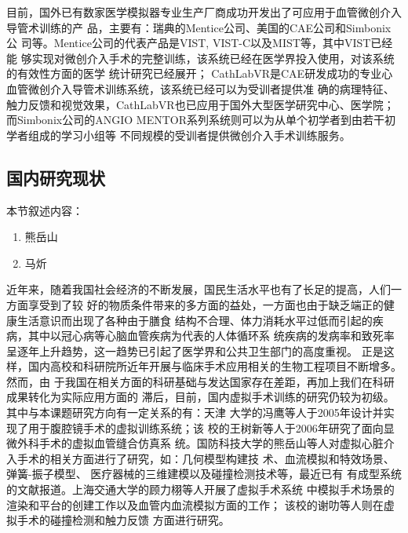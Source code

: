 目前，国外已有数家医学模拟器专业生产厂商成功开发出了可应用于血管微创介入导管术训练的产
品，主要有：瑞典的Mentice公司\cite{menticeweb}、美国的CAE公司\cite{caeweb}和Simbonix公
司\cite{simbionixweb}等。Mentice公司的代表产品是VIST, VIST-C以及MIST等，其中VIST已经能
够实现对微创介入手术的完整训练，该系统已经在医学界投入使用，对该系统的有效性方面的医学
统计研究已经展开\cite{duncan2006analysis}\cite{tedesco2008simulation}\cite{glaiberman2008simulation}；
CathLabVR是CAE研发成功的专业心血管微创介入导管术训练系统，该系统已经可以为受训者提供准
确的病理特征、触力反馈和视觉效果，CathLabVR也已应用于国外大型医学研究中心、医学院\cite{voelker2011improved}；
而Simbonix公司的ANGIO MENTOR系列系统则可以为从单个初学者到由若干初学者组成的学习小组等
不同规模的受训者提供微创介入手术训练服务\cite{hislop2009simulation}。

\subsection{国内研究现状}

本节叙述内容：
\begin{enumerate}
  \item 熊岳山
  \item 马炘
\end{enumerate}

近年来，随着我国社会经济的不断发展，国民生活水平也有了长足的提高，人们一方面享受到了较
好的物质条件带来的多方面的益处，一方面也由于缺乏端正的健康生活意识而出现了各种由于膳食
结构不合理、体力消耗水平过低而引起的疾病，其中以冠心病等心脑血管疾病为代表的人体循环系
统疾病的发病率和致死率呈逐年上升趋势，这一趋势已引起了医学界和公共卫生部门的高度重视。
正是这样，国内高校和科研院所近年开展与临床手术应用相关的生物工程项目不断增多。然而，由
于我国在相关方面的科研基础与发达国家存在差距，再加上我们在科研成果转化为实际应用方面的
滞后，目前，国内虚拟手术训练的研究仍较为初级。其中与本课题研究方向有一定关系的有：天津
大学的冯鹰\cite{li2005master}等人于2005年设计并实现了用于腹腔镜手术的虚拟训练系统；该
校的王树新等人\cite{zeng2006master}于2006年研究了面向显微外科手术的虚拟血管缝合仿真系
统。国防科技大学的熊岳山等人对虚拟心脏介入手术的相关方面进行了研究，如：几何模型构建技
术\cite{han2005master}、血流模拟和特效场景\cite{ren2005master}、弹簧-振子模型\cite{wang2006master}、
医疗器械的三维建模\cite{zhu2007master}以及碰撞检测技术\cite{kang2007master}等，最近已有
有成型系统的文献报道\cite{tan2012coronary}。上海交通大学的顾力栩等人开展了虚拟手术系统
中模拟手术场景的渲染和平台的创建工作\cite{zheng2008master}以及血管内血流模拟方面的工作\cite{huang2011virtual}；
该校的谢叻等人则在虚拟手术的碰撞检测\cite{wu2010virtual}和触力反馈\cite{wu2011virtual}
方面进行研究。


